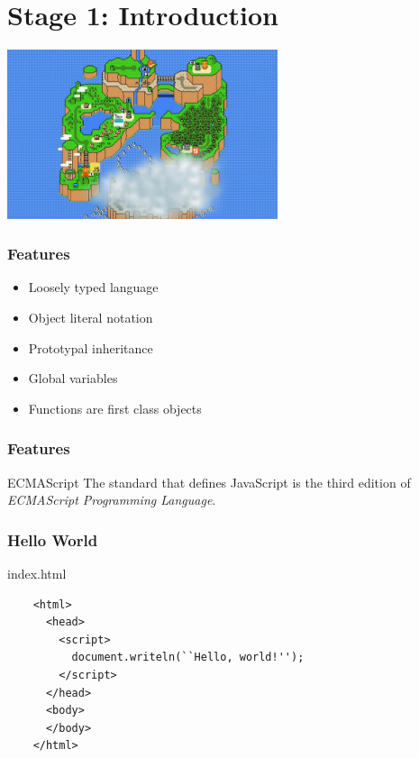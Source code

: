 \section{Stage 1: Introduction}

\begin{frame}
  \begin{center}
    \includegraphics[width=300px]{images/map_stage_1.png}
  \end{center}
\end{frame}

\begin{frame}
  \frametitle{Features}

  \begin{itemize}
    \item Loosely typed language
    \pause\item Object literal notation
    \pause\item Prototypal inheritance
    \pause\item Global variables
    \pause\item Functions are first class objects
  \end{itemize}
\end{frame}

\begin{frame}
  \frametitle{Features}

  \begin{block}{ECMAScript}
    The standard that defines JavaScript is the third edition of \textit{ECMAScript Programming Language}.
  \end{block}
\end{frame}

\begin{frame}[fragile]
  \frametitle{Hello World}

  \begin{block}{index.html}
    {\scriptsize
    \begin{verbatim}
    <html>
      <head>
        <script>
          document.writeln(``Hello, world!'');
        </script>
      </head>
      <body>
      </body>
    </html>
    \end{verbatim}
    }
  \end{block}
\end{frame}

